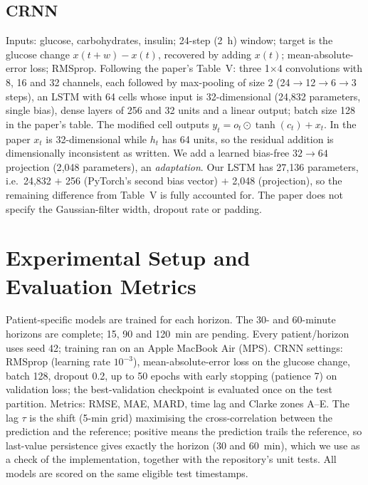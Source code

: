 \documentclass[conference]{IEEEtran}
\begin{document}
\subsection{CRNN}
Inputs: glucose, carbohydrates, insulin; 24-step (2~h) window; target is the glucose change $x(t+w)-x(t)$, recovered by adding $x(t)$; mean-absolute-error loss; RMSprop. Following the paper's Table~V: three 1$\times$4 convolutions with 8, 16 and 32 channels, each followed by max-pooling of size 2 (24$\to$12$\to$6$\to$3 steps), an LSTM with 64 cells whose input is 32-dimensional (24{,}832 parameters, single bias), dense layers of 256 and 32 units and a linear output; batch size 128 in the paper's table. The modified cell outputs $y_t=o_t\odot\tanh(c_t)+x_t$. In the paper $x_t$ is 32-dimensional while $h_t$ has 64 units, so the residual addition is dimensionally inconsistent as written. We add a learned bias-free $32\to64$ projection (2{,}048 parameters), an \emph{adaptation}. Our LSTM has 27{,}136 parameters, i.e.\ 24{,}832 $+$ 256 (PyTorch's second bias vector) $+$ 2{,}048 (projection), so the remaining difference from Table~V is fully accounted for. The paper does not specify the Gaussian-filter width, dropout rate or padding.

\section{Experimental Setup and Evaluation Metrics}
Patient-specific models are trained for each horizon. The 30- and 60-minute horizons are complete; 15, 90 and 120~min are pending. Every patient/horizon uses seed 42; training ran on an Apple MacBook Air (MPS). CRNN settings: RMSprop (learning rate $10^{-3}$), mean-absolute-error loss on the glucose change, batch 128, dropout 0.2, up to 50 epochs with early stopping (patience 7) on validation loss; the best-validation checkpoint is evaluated once on the test partition. Metrics: RMSE, MAE, MARD, time lag and Clarke zones A--E. The lag $\tau$ is the shift (5-min grid) maximising the cross-correlation between the prediction and the reference; positive means the prediction trails the reference, so last-value persistence gives exactly the horizon (30 and 60~min), which we use as a check of the implementation, together with the repository's unit tests. All models are scored on the same eligible test timestamps.
\end{document}
